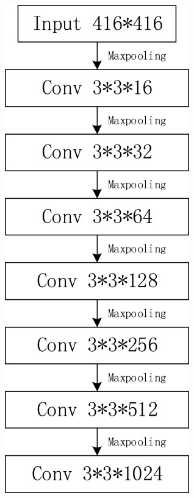 \begin{figure}[!ht]
    \centering
    \begin{subfigure}[b]{0.2\textwidth}
        \centering
        \includegraphics[width=\textwidth]{chapter2/images/yolo_tiny.jpg}

\end{subfigure}
\end{figure}
